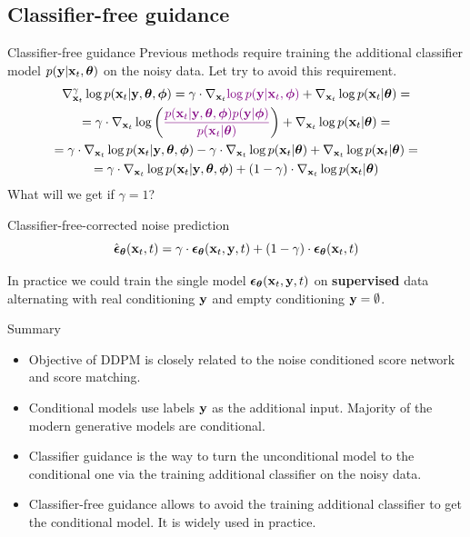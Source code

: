 \subsection{Classifier-free guidance}
\begin{frame}{Classifier-free guidance}
	Previous methods require training the additional classifier model $p(\mathbf{y} | \mathbf{x}_t, \boldsymbol{\theta})$ on the noisy data.
	Let try to avoid this requirement.
	\vspace{-0.3cm}
	\begin{multline*}
		\nabla_{\mathbf{x}_t}^{\gamma} \log p(\mathbf{x}_t | \mathbf{y}, \boldsymbol{\theta}, \boldsymbol{\phi}) = \gamma \cdot \nabla_{\mathbf{x}_t} {\color{violet}\log p(\mathbf{y} | \mathbf{x}_t, \boldsymbol{\phi})} + \nabla_{\mathbf{x}_t} \log p(\mathbf{x}_t | \boldsymbol{\theta}) = \\
		= \gamma \cdot  \nabla_{\mathbf{x}_t} \log \left( {\color{violet}\frac{p(\mathbf{x}_t| \mathbf{y}, \boldsymbol{\theta}, \boldsymbol{\phi}) p(\mathbf{y} | \boldsymbol{\phi})}{p(\mathbf{x}_t | \boldsymbol{\theta})}} \right) + \nabla_{\mathbf{x}_t} \log p(\mathbf{x}_t | \boldsymbol{\theta}) = \\
		= \gamma \cdot  \nabla_{\mathbf{x}_t} \log p(\mathbf{x}_t| \mathbf{y}, \boldsymbol{\theta}, \boldsymbol{\phi}) -\gamma \cdot  \nabla_{\mathbf{x}_t} \log  p(\mathbf{x}_t | \boldsymbol{\theta}) + \nabla_{\mathbf{x}_t} \log p(\mathbf{x}_t | \boldsymbol{\theta}) = \\
		= \gamma \cdot  \nabla_{\mathbf{x}_t} \log p(\mathbf{x}_t| \mathbf{y}, \boldsymbol{\theta}, \boldsymbol{\phi}) + (1 - \gamma) \cdot  \nabla_{\mathbf{x}_t} \log p(\mathbf{x}_t | \boldsymbol{\theta})
	\end{multline*}
	What will we get if $\gamma = 1$?
	\begin{block}{Classifier-free-corrected noise prediction}
		\vspace{-0.3cm}
		\[
			\hat{\boldsymbol{\epsilon}}_{\boldsymbol{\theta}}(\mathbf{x}_t, t) = \gamma \cdot \boldsymbol{\epsilon}_{\boldsymbol{\theta}}(\mathbf{x}_t, \mathbf{y}, t) + (1 - \gamma) \cdot \boldsymbol{\epsilon}_{\boldsymbol{\theta}}(\mathbf{x}_t, t)
		\]
		\vspace{-0.5cm}
	\end{block}
	In practice we could train the single model $\boldsymbol{\epsilon}_{\boldsymbol{\theta}}(\mathbf{x}_t, \mathbf{y}, t)$ on \textbf{supervised} data alternating with real conditioning $\mathbf{y}$ and empty conditioning $\mathbf{y} = \emptyset$.
\end{frame}
\begin{frame}{Summary}
	\begin{itemize}
		\item Objective of DDPM is closely related to the noise conditioned score network and score matching.	
		\vfill
		\item Conditional models use labels $\mathbf{y}$ as the additional input. Majority of the modern generative models are conditional.
		\vfill
		\item Classifier guidance is the way to turn the unconditional model to the conditional one via the training additional classifier on the noisy data.
		\vfill
		\item Classifier-free guidance allows to avoid the training additional classifier to get the conditional model. It is widely used in practice.
	\end{itemize}
\end{frame}
 
